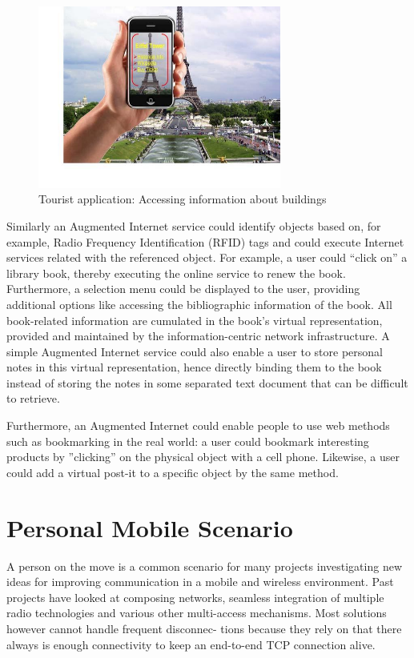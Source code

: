  \begin{figure}[h]
 \begin{center}
 \includegraphics[height=6cm]{4.jpg}
 \caption{Tourist application: Accessing information about buildings}
 \end{center}
 \end{figure}

Similarly an Augmented Internet service could identify objects based on, for example, Radio
Frequency Identification (RFID) tags and could execute Internet services related with the
referenced object. For example, a user could ``click on'' a library book, thereby executing the
online service to renew the book. Furthermore, a selection menu could be displayed to the
user, providing additional options like accessing the bibliographic information of the book. All
book-related information are cumulated in the book's virtual representation, provided and
maintained by the information-centric network infrastructure. A simple Augmented Internet
service could also enable a user to store personal notes in this virtual representation, hence
directly binding them to the book instead of storing the notes in some separated text document that can be difficult to retrieve.

Furthermore, an Augmented Internet could enable people to use web methods such as
bookmarking in the real world: a user could bookmark interesting products by ”clicking” on the
physical object with a cell phone. Likewise, a user could add a virtual post-it to a specific
object by the same method.

\section{Personal Mobile Scenario}
A person on the move is a common scenario for many projects investigating new ideas for
improving communication in a mobile and wireless environment. Past projects have looked at
composing networks, seamless integration of multiple radio technologies and various other
multi-access mechanisms. Most solutions however cannot handle frequent disconnec-
tions because they rely on that there always is enough connectivity to keep an end-to-end
TCP connection alive.

